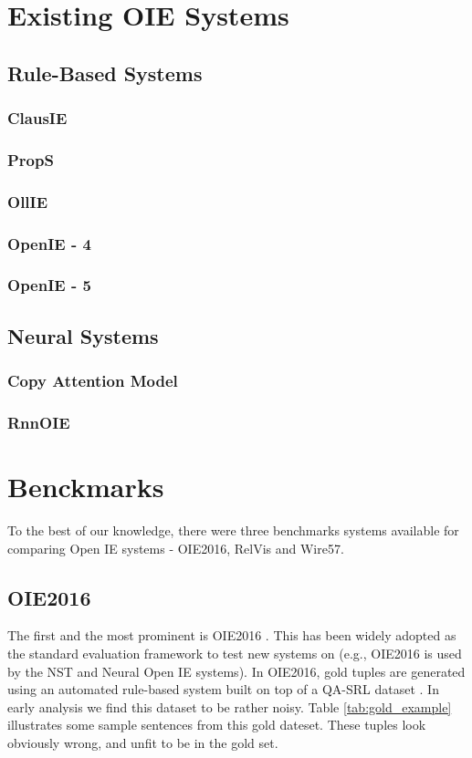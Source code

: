 \section{Existing OIE Systems}

\subsection{Rule-Based Systems}
\subsubsection{ClausIE}
\subsubsection{PropS}
\subsubsection{OllIE}
\subsubsection{OpenIE - 4}
\subsubsection{OpenIE - 5}

\subsection{Neural Systems}
\subsubsection{Copy Attention Model}
\subsubsection{RnnOIE}

\section{Benckmarks}
    To the best of our knowledge, there were three benchmarks systems available for comparing Open IE systems - OIE2016, RelVis and Wire57.

    \subsection{OIE2016}
        The first and the most prominent is OIE2016 \cite{OIE2016}. This has been widely adopted as the standard evaluation framework to test new systems on (e.g., OIE2016 is used by the NST \citep{Nst} and Neural Open IE \citep{cui&al18} systems).  In OIE2016, gold tuples are generated using an automated rule-based system built on top of a QA-SRL dataset \cite{QA-SRL}. In early analysis we find this dataset to be rather noisy. Table \ref{tab:gold_example} illustrates some sample sentences from this gold dateset. These tuples look obviously wrong, and unfit to be in the gold set.

